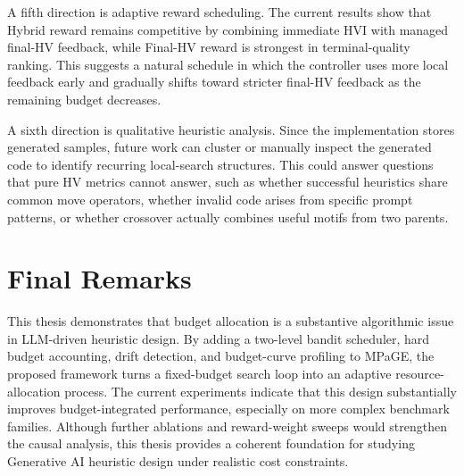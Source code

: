 \documentclass[../main.tex]{subfiles}
\begin{document}
A fifth direction is adaptive reward scheduling. The current results show that Hybrid reward remains competitive by combining immediate HVI with managed final-HV feedback, while Final-HV reward is strongest in terminal-quality ranking. This suggests a natural schedule in which the controller uses more local feedback early and gradually shifts toward stricter final-HV feedback as the remaining budget decreases.

A sixth direction is qualitative heuristic analysis. Since the implementation stores generated samples, future work can cluster or manually inspect the generated code to identify recurring local-search structures. This could answer questions that pure HV metrics cannot answer, such as whether successful heuristics share common move operators, whether invalid code arises from specific prompt patterns, or whether crossover actually combines useful motifs from two parents.

\section{Final Remarks}

This thesis demonstrates that budget allocation is a substantive algorithmic issue in LLM-driven heuristic design. By adding a two-level bandit scheduler, hard budget accounting, drift detection, and budget-curve profiling to MPaGE, the proposed framework turns a fixed-budget search loop into an adaptive resource-allocation process. The current experiments indicate that this design substantially improves budget-integrated performance, especially on more complex benchmark families. Although further ablations and reward-weight sweeps would strengthen the causal analysis, this thesis provides a coherent foundation for studying Generative AI heuristic design under realistic cost constraints.
\end{document}
